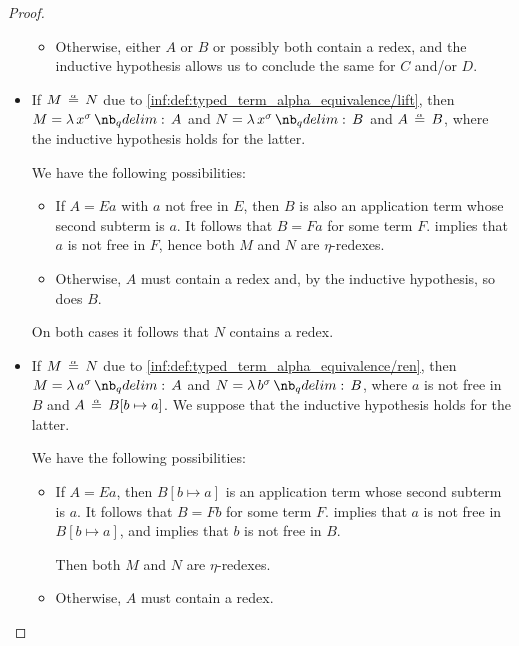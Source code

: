 \begin{proof}
\begin{itemize}
\begin{itemize}
      \item Otherwise, either \( A \) or \( B \) or possibly both contain a redex, and the inductive hypothesis allows us to conclude the same for \( C \) and/or \( D \).
    \end{itemize}

    \item If \( M \aequiv N \) due to \ref{inf:def:typed_term_alpha_equivalence/lift}, then \( M = \qabs {x^\sigma} A \) and \( N = \qabs {x^\sigma} B \) and \( A \aequiv B \), where the inductive hypothesis holds for the latter.

    We have the following possibilities:
    \begin{itemize}
      \item If \( A = Ea \) with \( a \) not free in \( E \), then \( B \) is also an application term whose second subterm is \( a \). It follows that \( B = Fa \) for some term \( F \).  implies that \( a \) is not free in \( F \), hence both \( M \) and \( N \) are \( \eta \)-redexes.

      \item Otherwise, \( A \) must contain a redex and, by the inductive hypothesis, so does \( B \).
    \end{itemize}

    On both cases it follows that \( N \) contains a redex.

    \item If \( M \aequiv N \) due to \ref{inf:def:typed_term_alpha_equivalence/ren}, then \( M = \qabs {a^\sigma} A \) and \( N = \qabs {b^\sigma} B \), where \( a \) is not free in \( B \) and \( A \aequiv B[b \mapsto a] \). We suppose that the inductive hypothesis holds for the latter.

    We have the following possibilities:
    \begin{itemize}
      \item If \( A = Ea \), then \( B[b \mapsto a] \) is an application term whose second subterm is \( a \). It follows that \( B = Fb \) for some term \( F \).  implies that \( a \) is not free in \( B[b \mapsto a] \), and  implies that \( b \) is not free in \( B \).

      Then both \( M \) and \( N \) are \( \eta \)-redexes.

      \item Otherwise, \( A \) must contain a redex.


\end{itemize}
\end{itemize}
\end{proof}
